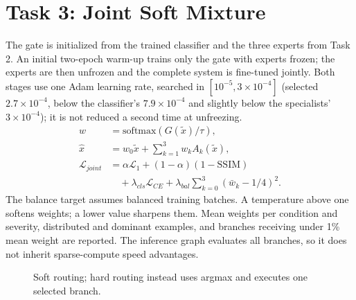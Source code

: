 \documentclass[conference]{IEEEtran}
\begin{document}
\section{Task 3: Joint Soft Mixture}
The gate is initialized from the trained classifier and the three experts from
Task 2. An initial two-epoch warm-up trains only the gate with experts frozen;
the experts are then unfrozen and the complete system is fine-tuned jointly.
Both stages use one Adam learning rate, searched in $[10^{-5},3\times10^{-4}]$
(selected $2.7\times10^{-4}$, below the classifier's $7.9\times10^{-4}$ and
slightly below the specialists' $3\times10^{-4}$); it is not reduced a second
time at unfreezing.
\begin{align}
w&=\mathrm{softmax}(G(\tilde{x})/\tau),\\
\hat{x}&=w_0\tilde{x}+\sum_{k=1}^{3}w_k A_k(\tilde{x}),\\
\mathcal{L}_{joint}&=\alpha\mathcal{L}_1+(1-\alpha)(1-\mathrm{SSIM})\nonumber\\
&\quad+\lambda_{cls}\mathcal{L}_{CE}+\lambda_{bal}\sum_{k=0}^{3}(\bar{w}_k-1/4)^2.
\end{align}
The balance target assumes balanced training batches. A temperature above one
softens weights; a lower value sharpens them. Mean weights per condition and
severity, distributed and dominant examples, and branches receiving under 1\%
mean weight are reported. The inference graph evaluates all branches, so it
does not inherit sparse-compute speed advantages.
\begin{figure}[!ht]\centering
{}\caption{Soft routing; hard routing instead uses argmax and executes one selected branch.}\end{figure}
\end{document}
